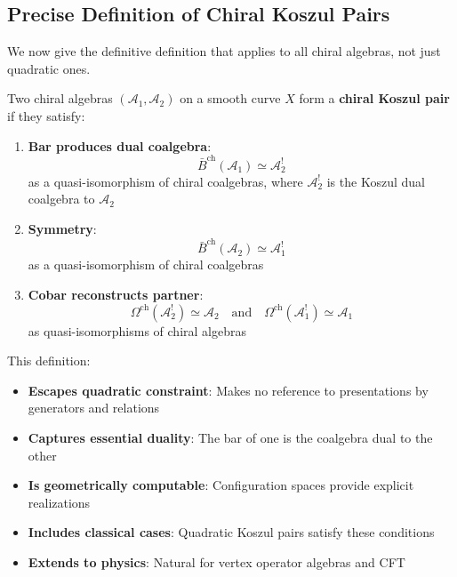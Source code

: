 \subsection{Precise Definition of Chiral Koszul Pairs}
\label{subsec:chiral-koszul-pairs-precise}

We now give the definitive definition that applies to all chiral algebras, not just 
quadratic ones.

\begin{definition}
\label{def:chiral-koszul-pair-bar-cobar}
Two chiral algebras $(\mathcal{A}_1, \mathcal{A}_2)$ on a smooth curve $X$ form a 
\textbf{chiral Koszul pair} if they satisfy:

\begin{enumerate}
\item \textbf{Bar produces dual coalgebra}:
      $$\bar{B}^{\text{ch}}(\mathcal{A}_1) \simeq \mathcal{A}_2^!$$
      as a quasi-isomorphism of chiral coalgebras, where $\mathcal{A}_2^!$ is the 
      Koszul dual coalgebra to $\mathcal{A}_2$

\item \textbf{Symmetry}:
      $$\bar{B}^{\text{ch}}(\mathcal{A}_2) \simeq \mathcal{A}_1^!$$
      as a quasi-isomorphism of chiral coalgebras

\item \textbf{Cobar reconstructs partner}:
      $$\Omega^{\text{ch}}(\mathcal{A}_2^!) \simeq \mathcal{A}_2 \quad \text{and} \quad 
        \Omega^{\text{ch}}(\mathcal{A}_1^!) \simeq \mathcal{A}_1$$
      as quasi-isomorphisms of chiral algebras
\end{enumerate}
\end{definition}

\begin{remark}
\label{rem:why-definition-works}
This definition:
\begin{itemize}
\item \textbf{Escapes quadratic constraint}: Makes no reference to presentations by 
      generators and relations
\item \textbf{Captures essential duality}: The bar of one is the coalgebra dual to the other
\item \textbf{Is geometrically computable}: Configuration spaces provide explicit realizations
\item \textbf{Includes classical cases}: Quadratic Koszul pairs satisfy these conditions
\item \textbf{Extends to physics}: Natural for vertex operator algebras and CFT
\end{itemize}
\end{remark}

